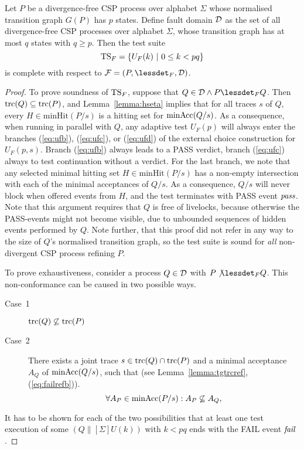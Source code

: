 \begin{theorem}
Let $P$ be a divergence-free CSP process over alphabet $\Sigma$ 
whose normalised transition graph $G(P)$ has $p$ states. Define fault domain ${\cal D}$ as
the set of all divergence-free CSP processes over alphabet $\Sigma$, whose transition graph
has at most $q$ states with $q \ge p$. 
Then the test suite 
\[
{\text{TS}}_F = \{ U_F(k)~|~0 \le k < pq  \}
\]
is complete with respect to ${\cal F} = (P,\lessdet_F,{\cal D})$.
\end{theorem}
\begin{proof}
To prove soundness of ${\text{TS}}_F$, suppose that $Q\in{\cal D} \wedge P\lessdet_F Q$. Then
$\text{trc}(Q)\subseteq \text{trc}(P)$, and Lemma~\ref{lemma:hseta} implies that 
for all traces $s$ of $Q$, every $H\in\text{minHit}(P/s)$ is a 
    hitting set for $\text{minAcc}(Q/s)$. As a consequence, when running in parallel
with $Q$, any adaptive test $U_F(p)$ will always enter the branches 
(\ref{eq:ufb}), (\ref{eq:ufc}),  or (\ref{eq:ufd}) of the external choice construction
for $U_F(p,s)$. Branch (\ref{eq:ufb}) always leads to a PASS verdict, branch (\ref{eq:ufc})
always to test continuation without a verdict. For the last branch, we note that 
any selected minimal hitting set $H\in\text{minHit}(P/s)$ has a non-empty intersection with
each of the minimal acceptances of $Q/s$. As a consequence, $Q/s$ will never block when offered events from $H$, and the test terminates with PASS event ${\text{\it pass}}$. Note that this argument requires that $Q$ is free of livelocks, because otherwise the PASS-events might not become visible, due to unbounded sequences of hidden events performed by $Q$. Note further, that this proof did not refer in any way to the size of $Q$'s normalised transition graph, so the test suite is sound for {\it all} non-divergent CSP process refining $P$.

To prove exhaustiveness, consider a process $Q\in{\cal D}$ with $P\not\lessdet_F Q$. This non-conformance can be caused in two possible ways.
\begin{description}
\item[Case~1] $\text{trc}(Q)\not\subseteq \text{trc}(P)$
\item[Case~2] There exists a joint trace $s\in\text{trc}(Q)\cap\text{trc}(P)$ and a minimal acceptance $A_Q$
of $\text{minAcc}(Q/s)$, such that 
(see Lemma~\ref{lemma:tgtrcref}, (\ref{eq:failrefb})).
\begin{equation}
\label{eq:accsnotcontained}
\forall A_P\in\text{minAcc}(P/s): A_P\not\subseteq A_Q,
\end{equation} 
\end{description}
It has to be shown for each of the two possibilities that at least one test execution of some $(Q\parallel[\Sigma] U(k))$ with $k < pq$ ends with the FAIL event ${\text{\it fail}}$.


\end{proof}

